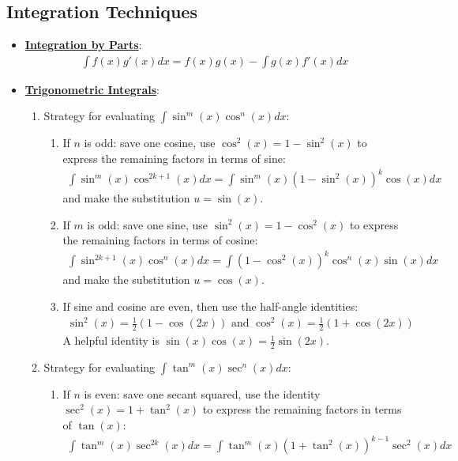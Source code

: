\documentclass[11pt]{article}
\newcommand{\dfn}[1]{\underline{\textbf{#1}}}
\begin{document}
\subsection{Integration Techniques}
\begin{itemize}[noitemsep]
	\item \dfn{Integration by Parts}: 
	\begin{align}
		\int f(x) g'(x) dx = f(x) g(x) - \int g(x) f'(x) dx 	
	\end{align}
	\item \dfn{Trigonometric Integrals}: 
	\begin{enumerate}[noitemsep]
		\item Strategy for evaluating $\int \sin^m(x) \cos^n (x) dx$: 
		\begin{enumerate}[noitemsep]
			\item If $n$ is odd: save one cosine, use $\cos^2(x) = 1-\sin^2(x)$ to express the remaining factors in terms of sine: 
			\begin{align}
				\int \sin^m(x) \cos^{2k+1}(x) dx = \int \sin^m(x) (1-\sin^2(x))^k \cos(x) dx 	
			\end{align}
			and make the substitution $u=\sin(x)$. 
			\item If $m$ is odd: save one sine, use $\sin^2(x) = 1 - \cos^2(x)$ to express the remaining factors in terms of cosine: 
			\begin{align}
				\int \sin^{2k+1}(x) \cos^n (x) dx = \int (1-\cos^2(x))^k \cos^n (x) \sin (x) dx 	
			\end{align}
			and make the substitution $u = \cos(x)$.
			\item If sine and cosine are even, then use the half-angle identities: 
			\begin{align}
				\sin^2(x) = \frac{1}{2} ( 1 - \cos (2x)) \text{ and } \cos^2(x) = \frac{1}{2} ( 1 + \cos(2x)) 	
			\end{align}
			A helpful identity is $\sin (x) \cos(x) = \frac{1}{2} \sin (2x)$. 
		\end{enumerate}
		\item Strategy for evaluating $\int \tan^m (x) \sec^n(x) dx$: 
		\begin{enumerate}[noitemsep]
			\item If $n$ is even: save one secant squared, use the identity $\sec^2(x) = 1 + \tan^2(x)$ to express the remaining factors in terms of $\tan (x)$: 
			\begin{align}
				\int \tan^m(x) \sec^{2k} (x) dx = \int \tan^m(x) (1+\tan^2(x))^{k-1} \sec^2(x) dx 	

\end{align}
\end{enumerate}
\end{enumerate}
\end{itemize}
\end{document}

